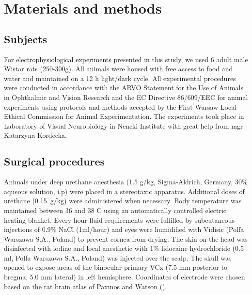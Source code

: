 \documentclass{pracalicmgr}
\begin{document}
\chapter{Materials and methods}   
 	\section{Subjects}
 	For electrophysiological experiments presented in this study, we used 6 adult male Wistar rats (250-300g). All animals were housed with free access to food and water and maintained on a 12 h light/dark cycle. All experimental procedures  were conducted in accordance with the ARVO Statement for the Use of Animals in Ophthalmic and Vision Research and  the EC Directive 86/609/EEC for animal experiments using protocols and methods accepted by the First Warsaw Local Ethical Commission for Animal Experimentation. The experiments took place in Laboratory of Visual Neurobiology in Nencki Institute with great help from mgr Katarzyna Kordecka.
 
 	
 	\section{Surgical procedures}
 	Animals under deep urethane anesthesia (1.5 g/kg, Sigma-Aldrich, Germany, 30\% aqueous solution, i.p) were placed in a stereotaxic apparatus. Additional doses of urethane (0.15~g/kg) were administered when necessary. Body temperature was maintained between 36 and 38 \degree C using an automatically controlled electric heating blanket. Every hour fluid requirements were fulfilled by subcutaneous injections of 0.9\% NaCl (1ml/hour) and eyes were humidified with Vidisic (Polfa Warszawa S.A., Poland) to prevent cornea from drying. The skin on the head was disinfected with iodine and local anesthetic with 1\% lidocaine hydrochloride (0.5 ml, Polfa Warszawa S.A., Poland) was injected over the scalp. The skull was opened to expose areas of the binocular primary VCx (7.5 mm posterior to bregma, 5.0 mm lateral) in left hemisphere. Coordinates of electrode were chosen based on the rat brain atlas of Paxinos and Watson (\cite{atlas}). 
 	
\end{document}
